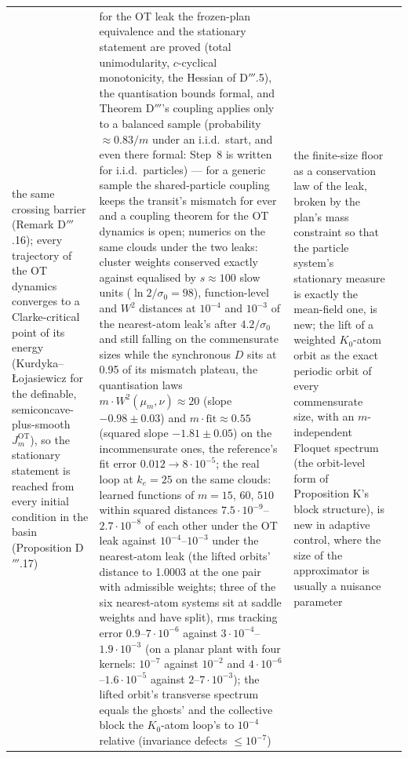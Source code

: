 {\begin{longtable}{@{}>{\raggedright\arraybackslash}p{}>{\raggedright\arraybackslash}p{}%
>{\raggedright\arraybackslash}p{}>{\raggedright\arraybackslash}p{}@{}}
the same crossing barrier (Remark D$'''$.16); every trajectory of the OT dynamics converges to a Clarke-critical point
of its energy (Kurdyka--{\L}ojasiewicz for the definable, semiconcave-plus-smooth $J_m^{\mathrm{OT}}$), so the
stationary statement is reached from every initial condition in the basin (Proposition D$'''$.17)
& for the OT leak the frozen-plan equivalence and the stationary statement are proved (total
unimodularity, $c$-cyclical monotonicity, the Hessian of D$'''$.5), the quantisation bounds formal, and Theorem
D$'''$'s coupling applies only to a balanced sample (probability $\approx0.83/m$ under an i.i.d.\ start, and even
there formal: Step~8 is written for i.i.d.\ particles) --- for a generic sample the shared-particle coupling keeps
the transit's mismatch for ever and a coupling theorem for the OT dynamics is open; numerics on the same clouds
under the two leaks: cluster weights conserved exactly against equalised by $s\approx100$ slow units
($\ln2/\sigma_0 = 98$), function-level and $W^2$ distances at $10^{-4}$ and $10^{-3}$ of the nearest-atom leak's
after $4.2/\sigma_0$ and still falling on the commensurate sizes while the synchronous $D$ sits at 0.95 of its
mismatch plateau, the quantisation laws $m\cdot W^2(\mu_m,\nu)\approx20$ (slope $-0.98\pm0.03$) and
$m\cdot\mathrm{fit}\approx0.55$ (squared slope $-1.81\pm0.05$) on the incommensurate ones, the reference's fit error
$0.012\to8\cdot10^{-5}$; the real loop at $k_e = 25$ on the same clouds: learned functions of $m = 15$, $60$, $510$
within squared distances $7.5\cdot10^{-9}$--$2.7\cdot10^{-8}$ of each other under the OT leak against
$10^{-4}$--$10^{-3}$ under the nearest-atom leak (the lifted orbits' distance to 1.0003 at the one pair with
admissible weights; three of the six nearest-atom systems sit at saddle weights and have split), rms tracking error
$0.9$--$7\cdot10^{-6}$ against $3\cdot10^{-4}$--$1.9\cdot10^{-3}$ (on a planar plant with four kernels: $10^{-7}$
against $10^{-2}$ and $4\cdot10^{-6}$--$1.6\cdot10^{-5}$ against $2$--$7\cdot10^{-3}$); the lifted orbit's
transverse spectrum equals the ghosts' and the collective block the $K_0$-atom loop's to $10^{-4}$ relative
(invariance defects $\le10^{-7}$)
& the finite-size floor
as a conservation law of the leak, broken by the plan's mass constraint so that the particle system's stationary
measure is exactly the mean-field one, is new; the lift of a weighted $K_0$-atom orbit as the exact periodic orbit of
every commensurate size, with an $m$-independent Floquet spectrum (the orbit-level form of Proposition K's block
structure), is new in adaptive control, where the size of the approximator is usually a nuisance parameter\\

\end{longtable}}
